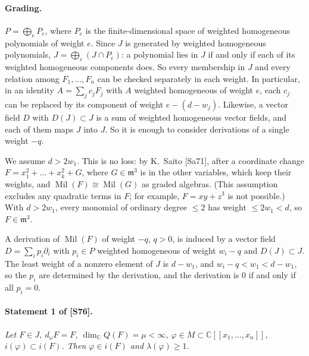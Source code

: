 \documentclass[11pt]{article}
\newcommand{\C}{\mathbb{C}}
\newcommand{\Mil}{\operatorname{Mil}(F)}
\theoremstyle{remark}
\begin{document}
\paragraph{Grading.} $P=\bigoplus_eP_e$, where $P_e$ is the finite-dimensional space of weighted homogeneous polynomials of weight $e$. Since $J$ is generated by weighted homogeneous polynomials, $J=\bigoplus_e(J\cap P_e)$: a polynomial lies in $J$ if and only if each of its weighted homogeneous components does. So every membership in $J$ and every relation among $F_1,\dots,F_n$ can be checked separately in each weight. In particular, in an identity $A=\sum_jc_jF_j$ with $A$ weighted homogeneous of weight $e$, each $c_j$ can be replaced by its component of weight $e-(d-w_j)$. Likewise, a vector field $D$ with $D(J)\subset J$ is a sum of weighted homogeneous vector fields, and each of them maps $J$ into $J$. So it is enough to consider derivations of a single weight $-q$.

We assume $d>2w_1$. This is no loss: by K.~Saito [Sa71], after a coordinate change $F=x_1^2+\dots+x_k^2+G$, where $G\in\mathfrak m^3$ is in the other variables, which keep their weights, and $\Mil\cong\operatorname{Mil}(G)$ as graded algebras. (This assumption excludes any quadratic terms in $F$; for example, $F=xy+z^3$ is not possible.) With $d>2w_1$, every monomial of ordinary degree $\le2$ has weight $\le2w_1<d$, so $F\in\mathfrak m^3$.

A derivation of $\Mil$ of weight $-q$, $q>0$, is induced by a vector field $D=\sum_ip_i\partial_i$ with $p_i\in P$ weighted homogeneous of weight $w_i-q$ and $D(J)\subset J$. The least weight of a nonzero element of $J$ is $d-w_1$, and $w_i-q<w_1<d-w_1$, so the $p_i$ are determined by the derivation, and the derivation is $0$ if and only if all $p_i=0$.

\paragraph{Statement 1 of [S76].} \emph{Let $F\in J$, $d_\omega F=F$, $\dim_{\C}Q(F)=\mu<\infty$, $\varphi\in M\subset\C[[x_1,\dots,x_n]]$, $i(\varphi)\subset i(F)$. Then $\varphi\in i(F)$ and $\lambda(\varphi)\ge1$.}
\end{document}
